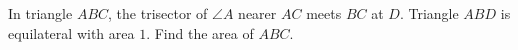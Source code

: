 In triangle $ABC$, the trisector of $\angle A$ nearer $AC$ meets $BC$ at $D$. Triangle $ABD$ is equilateral with area $1$. Find the area of $ABC$.

